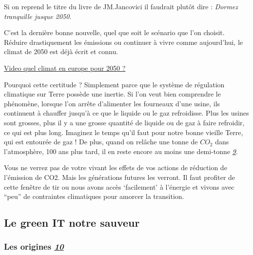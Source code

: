 Si on reprend le titre du livre de JM.Jancovici il faudrait plutôt dire
: \emph{Dormez tranquille jusque 2050}.

C'est la dernière bonne nouvelle, quel que soit le scénario que l'on
choisit. Réduire drastiquement les émissions ou continuer à vivre comme
aujourd'hui, le climat de 2050 est déjà écrit et connu.

\href{https://youtu.be/64xNugjI6jc}{Video quel climat en europe pour
2050 ?}

Pourquoi cette certitude ? Simplement parce que le système de régulation
climatique sur Terre possède une inertie. Si l'on veut bien comprendre
le phénomène, lorsque l'on arrête d'alimenter les fourneaux d'une usine,
ils continuent à chauffer jusqu'à ce que le liquide ou le gaz
refroidisse. Plus les usines sont grosses, plus il y a une grosse
quantité de liquide ou de gaz à faire refroidir, ce qui est plus long.
Imaginez le temps qu'il faut pour notre bonne vieille Terre, qui est
entourée de gaz ! De plus, quand on relâche une tonne de \(CO_2\) dans
l'atmosphère, 100 ans plus tard, il en reste encore au moins une
demi-tonne
\emph{\href{https://jancovici.com/changement-climatique/gaz-a-effet-de-serre-et-cycle-du-carbone/quels-sont-les-gaz-a-effet-de-serre-quels-sont-leurs-contribution-a-leffet-de-serre/}{9}}.

Vous ne verrez pas de votre vivant les effets de vos actions de
réduction de l'émission de CO2. Mais les générations futures les
verront. Il faut profiter de cette fenêtre de tir ou nous avons accès
`facilement' à l'énergie et vivons avec ``peu'' de contraintes
climatiques pour amorcer la transition.

\hypertarget{le-green-it-notre-sauveur}{%
\subsection{Le green IT notre sauveur}\label{le-green-it-notre-sauveur}}

\hypertarget{les-origines-10}{%
\subsubsection{\texorpdfstring{Les origines
\emph{\href{https://fr.wikipedia.org/wiki/Informatique_durable\#Historique}{10}}}{Les origines 10}}\label{les-origines-10}}


